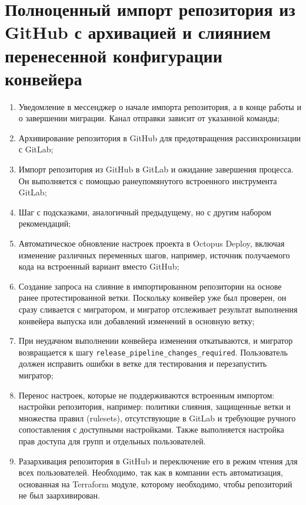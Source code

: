 \section{Полноценный импорт репозитория из GitHub с архивацией и слиянием перенесенной конфигурации конвейера} \label{sec:third-phase}

\begin{enumerate}
  \item Уведомление в мессенджер о начале импорта репозитория, а в конце работы и о завершении миграции.
        Канал отправки зависит от указанной команды;
  \item Архивирование репозитория в GitHub для предотвращения рассинхронизации с GitLab;
  \item Импорт репозитория из GitHub в GitLab и ожидание завершения процесса.
        Он выполняется с помощью ранеупомянутого встроенного инструмента GitLab;
  \item Шаг с подсказками, аналогичный предыдущему, но с другим набором рекомендаций;
  \item Автоматическое обновление настроек проекта в Octopus Deploy, включая изменение различных переменных шагов, например, источник получаемого кода на встроенный вариант вместо GitHub;
  \item Создание запроса на слияние в импортированном репозитории на основе ранее протестированной ветки.
        Поскольку конвейер уже был проверен, он сразу сливается с мигратором, и мигратор отслеживает результат выполнения конвейера выпуска или добавлений изменений в основную ветку;
  \item При неудачном выполнении конвейера изменения откатываются, и мигратор возвращается к шагу \texttt{release\_pipeline\_changes\_required}.
        Пользователь должен исправить ошибки в ветке для тестирования и перезапустить мигратор;
  \item Перенос настроек, которые не поддерживаются встроенным импортом: настройки репозитория, например: политики слияния, защищенные ветки и множества правил (rulesets), отсутствующие в GitLab и требующие ручного сопоставления с доступными настройками.
        Также выполняется настройка прав доступа для групп и отдельных пользователей.
  \item Разархивация репозитория в GitHub и переключение его в режим чтения для всех пользователей.
        Необходимо, так как в компании есть автоматизация, основанная на Terraform модуле, которому необходимо, чтобы репозиторий не был заархивирован.
\end{enumerate}


